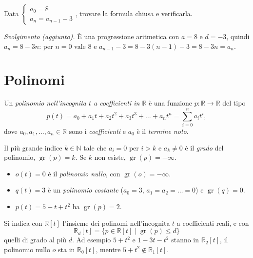 \documentclass[11pt,a4paper]{article}
\begin{document}
\begin{esercizio}
Data $\begin{cases} a_0 = 8\\ a_n = a_{n-1} - 3 \end{cases}$, trovare la formula
chiusa e verificarla.
\end{esercizio}

\emph{Svolgimento (aggiunto).} È una progressione aritmetica con $a = 8$ e
$d = -3$, quindi $a_n = 8 - 3n$: per $n = 0$ vale $8$ e
$a_{n-1} - 3 = 8 - 3(n-1) - 3 = 8 - 3n = a_n$.

\section{Polinomi}

\begin{definizione}
Un \emph{polinomio nell'incognita $t$ a coefficienti in $\mathbb{R}$} è una
funzione $p \colon \mathbb{R} \to \mathbb{R}$ del tipo
\[
  p(t) = a_0 + a_1 t + a_2 t^2 + a_3 t^3 + \dots + a_n t^n
       = \sum_{i=0}^{n} a_i t^i ,
\]
dove $a_0, a_1, \dots, a_n \in \mathbb{R}$ sono i \emph{coefficienti} e $a_0$ è
il \emph{termine noto}.

Il più grande indice $k \in \mathbb{N}$ tale che $a_i = 0$ per $i > k$ e
$a_k \neq 0$ è il \emph{grado} del polinomio, $\operatorname{gr}(p) = k$. Se
$k$ non esiste, $\operatorname{gr}(p) = -\infty$.
\end{definizione}

\begin{esempio}
\begin{itemize}
    \item $o(t) = 0$ è il \emph{polinomio nullo}, con
          $\operatorname{gr}(o) = -\infty$.
    \item $q(t) = 3$ è un \emph{polinomio costante}
          ($a_0 = 3$, $a_1 = a_2 = \dots = 0$) e $\operatorname{gr}(q) = 0$.
    \item $p(t) = 5 - t + t^2$ ha $\operatorname{gr}(p) = 2$.
\end{itemize}
\end{esempio}

Si indica con $\mathbb{R}[t]$ l'insieme dei polinomi nell'incognita $t$ a
coefficienti reali, e con
\[
  \mathbb{R}_d[t] = \{ p \in \mathbb{R}[t] \mid \operatorname{gr}(p) \leq d \}
\]
quelli di grado al più $d$. Ad esempio $5 + t^2$ e $1 - 3t - t^2$ stanno in
$\mathbb{R}_2[t]$, il polinomio nullo $o$ sta in $\mathbb{R}_0[t]$, mentre
$5 + t^2 \notin \mathbb{R}_1[t]$.
\end{document}
